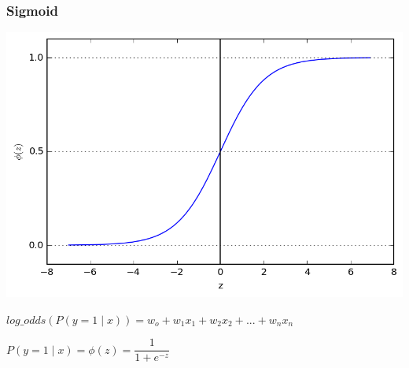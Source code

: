 \documentclass[aspectratio=169]{beamer}
\begin{document}
\begin{frame}
\frametitle{Sigmoid}
\includegraphics[scale = 0.5]{pic/sigmoid.png}  

${log\_odds}(P(y=1 \mid x)) = w_o + w_1x_1 + w_2x_2 + ... + w_nx_n$

$P(y=1 \mid x) = \phi(z) = \dfrac{1}{1 + e^{-z}}$

\end{frame}





\end{document}
